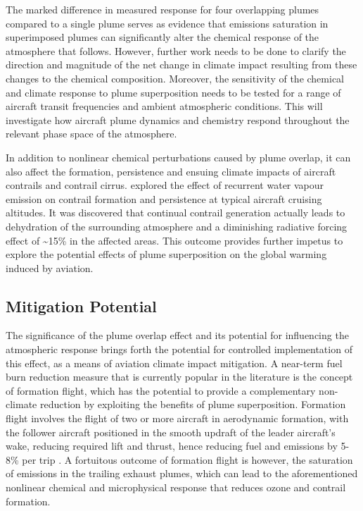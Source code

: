 The marked difference in measured response for four overlapping plumes compared to a single plume serves as evidence that emissions saturation in superimposed plumes can significantly alter the chemical response of the atmosphere that follows. However, further work needs to be done to clarify the direction and magnitude of the net change in climate impact resulting from these changes to the chemical composition. Moreover, the sensitivity of the chemical and climate response to plume superposition needs to be tested for a range of aircraft transit frequencies and ambient atmospheric conditions. This will investigate how aircraft plume dynamics and chemistry respond throughout the relevant phase space of the atmosphere.

In addition to nonlinear chemical perturbations caused by plume overlap, it can also affect the formation, persistence and ensuing climate impacts of aircraft contrails and contrail cirrus. \cite{Schumann2015} explored the effect of recurrent water vapour emission on contrail formation and persistence at typical aircraft cruising altitudes. It was discovered that continual contrail generation actually leads to dehydration of the surrounding atmosphere and a diminishing radiative forcing effect of \textasciitilde15\% in the affected areas. This outcome provides further impetus to explore the potential effects of plume superposition on the global warming induced by aviation.

\subsection{Mitigation Potential}
The significance of the plume overlap effect and its potential for influencing the atmospheric response brings forth the potential for controlled implementation of this effect, as a means of aviation climate impact mitigation. A near-term fuel burn reduction measure that is currently popular in the literature is the concept of formation flight, which has the potential to provide a complementary non- climate reduction by exploiting the benefits of plume superposition.
Formation flight involves the flight of two or more aircraft in aerodynamic formation, with the follower aircraft positioned in the smooth updraft of the leader aircraft's wake, reducing required lift and thrust, hence reducing fuel and  emissions by 5-8\% per trip \cite{Xu2014}. A fortuitous outcome of formation flight is however, the saturation of emissions in the trailing exhaust plumes, which can lead to the aforementioned nonlinear chemical and microphysical response that reduces ozone and contrail formation. 

